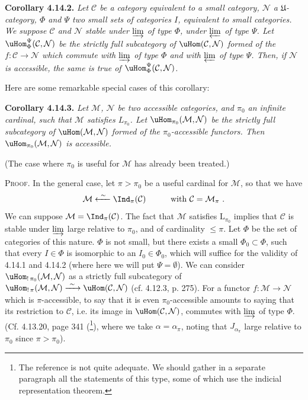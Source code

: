
\noindent\textbf{Corollary 4.14.2.} {\itshape Let $\mathcal{C}$ be a category equivalent to a small category, $\mathcal{N}$ a $\mathfrak{U}$-category, $\Phi$ and $\Psi$ two small sets of categories $I$, equivalent to small categories. We suppose $\mathcal{C}$ and $\mathcal{N}$ stable under $\varinjlim$ of type $\Phi$, under $\varprojlim$ of type $\Psi$. Let $\uHom^{\Psi}_{\Phi}(\mathcal{C},\mathcal{N})$ be the strictly full subcategory of $\uHom(\mathcal{C},\mathcal{N})$ formed of the $f:\mathcal{C}\longrightarrow\mathcal{N}$ which commute with $\varinjlim$ of type $\Phi$ and with $\varprojlim$ of type $\Psi$. Then, if $\mathcal{N}$ is accessible, the same is true of $\uHom^{\Psi}_{\Phi}(\mathcal{C},\mathcal{N})$.}

Here are some remarkable special cases of this corollary:

\noindent\textbf{Corollary 4.14.3.} {\itshape Let $\mathcal{M}$, $\mathcal{N}$ be two accessible categories, and $\pi_0$ an infinite cardinal, such that $\mathcal{M}$ satisfies $L_{\pi_0}$. Let $\uHom_{\pi_0}(\mathcal{M},\mathcal{N})$ be the strictly full subcategory of $\uHom(\mathcal{M},\mathcal{N})$ formed of the $\pi_0$-accessible functors. Then $\uHom_{\pi_0}(\mathcal{M},\mathcal{N})$ is accessible.}


(The case where $\pi_0$ is useful for $\mathcal{M}$ has already been treated.)

\noindent\textsc{Proof}. In the general case, let $\pi>\pi_0$ be a useful cardinal for $\mathcal{M}$, so that we have
\[
\mathcal{M} \xleftarrow{\ \sim\ } \Ind_\pi(\mathcal{C}) \qquad\quad \text{with } \mathcal{C}=\mathcal{M}_\pi\ .
\]
We can suppose $\mathcal{M}=\Ind_\pi(\mathcal{C})$. The fact that $\mathcal{M}$ satisfies $\mathrm{L}_{\pi_0}$ implies that $\mathcal{C}$ is stable under $\varinjlim$ large relative to $\pi_0$, and of cardinality $\leqslant\pi$. Let $\Phi$ be the set of categories of this nature. $\Phi$ is not small, but there exists a small $\Phi_0\subset\Phi$, such that every $I\in\Phi$ is isomorphic to an $I_0\in\Phi_0$, which will suffice for the validity of 4.14.1 and 4.14.2 (where here we will put $\Psi=\emptyset$). We can consider $\uHom_{!\,\pi_0}(\mathcal{M},\mathcal{N})$ as a strictly full subcategory of $\uHom_{!\,\pi}(\mathcal{M},\mathcal{N})\xrightarrow{\ \sim\ }\uHom(\mathcal{C},\mathcal{N})$ (cf. 4.12.3, p. 275). For a functor $f:\mathcal{M}\longrightarrow\mathcal{N}$ which is $\pi$-accessible, to say that it is even $\pi_0$-accessible amounts to saying that its restriction to $\mathcal{C}$, i.e. its image in $\uHom(\mathcal{C},\mathcal{N})$, commutes with $\varinjlim$ of type $\Phi$. (Cf. 4.13.20, page 341 (\footnote[164]{The reference is not quite adequate. We should gather in a separate paragraph all the statements of this type, some of which use the indicial representation theorem.}), where we take $\alpha=\alpha_\pi$, noting that $J_{\alpha_\pi}$ large relative to $\pi_0$ since $\pi>\pi_0$).

